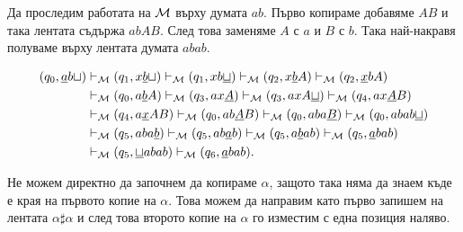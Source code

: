 \begin{example}
Да проследим работата на $\mathcal{M}$ върху думата $ab$.
Първо копираме добавяме $AB$ и така лентата съдържа $abAB$. 
След това заменяме $A$ с $a$ и $B$ с $b$. Така най-накравя полуваме върху лентата думата $abab$.

\begin{align*}
  (q_0, \underline{a}b\sqcup) & \vdash_{\mathcal{M}} (q_1, x\underline{b}\sqcup) \vdash_{\mathcal{M}} (q_1,xb\underline{\sqcup}) \vdash_{\mathcal{M}} (q_2, x\underline{b}A) \vdash_{\mathcal{M}} (q_2, \underline{x}bA)\\
                        & \vdash_{\mathcal{M}} (q_0, a\underline{b}A) \vdash_{\mathcal{M}} (q_3, ax\underline{A}) \vdash_{\mathcal{M}} (q_3, axA\underline{\sqcup}) \vdash_{\mathcal{M}} (q_4, ax\underline{A}B)\\
                        & \vdash_{\mathcal{M}} (q_4, a\underline{x}AB) \vdash_{\mathcal{M}} (q_0, ab\underline{A}B) \vdash_{\mathcal{M}} (q_0,aba\underline{B}) \vdash_{\mathcal{M}} (q_0, abab\underline{\sqcup})\\
                        & \vdash_{\mathcal{M}} (q_5, aba\underline{b}) \vdash_{\mathcal{M}} (q_5, ab\underline{a}b) \vdash_{\mathcal{M}} (q_5, a\underline{b}ab) \vdash_{\mathcal{M}} (q_5, \underline{a}bab)\\
                        & \vdash_{\mathcal{M}} (q_5, \underline{\sqcup}abab) \vdash_{\mathcal{M}} (q_6, \underline{a}bab).
\end{align*}

Не можем директно да започнем да копираме $\alpha$, защото така няма да знаем къде е края на първото копие на $\alpha$.
Това можем да направим като първо запишем на лентата $\alpha \sharp \alpha$ и след това второто копие на $\alpha$ го изместим с една позиция наляво.
\end{example}

